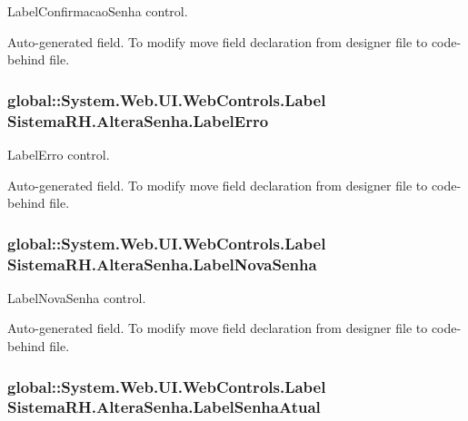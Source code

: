 LabelConfirmacaoSenha control. 

Auto-\/generated field. To modify move field declaration from designer file to code-\/behind file. \hypertarget{class_sistema_r_h_1_1_altera_senha_ab821993f47e320b0d86f898fcde56d56}{
\subsubsection[{LabelErro}]{\setlength{\rightskip}{0pt plus 5cm}global::System.Web.UI.WebControls.Label {\bf SistemaRH.AlteraSenha.LabelErro}}}
\label{class_sistema_r_h_1_1_altera_senha_ab821993f47e320b0d86f898fcde56d56}


LabelErro control. 

Auto-\/generated field. To modify move field declaration from designer file to code-\/behind file. \hypertarget{class_sistema_r_h_1_1_altera_senha_aaf58ce95cd22dfdadb96b4f62240e9ee}{
\subsubsection[{LabelNovaSenha}]{\setlength{\rightskip}{0pt plus 5cm}global::System.Web.UI.WebControls.Label {\bf SistemaRH.AlteraSenha.LabelNovaSenha}}}
\label{class_sistema_r_h_1_1_altera_senha_aaf58ce95cd22dfdadb96b4f62240e9ee}


LabelNovaSenha control. 

Auto-\/generated field. To modify move field declaration from designer file to code-\/behind file. \hypertarget{class_sistema_r_h_1_1_altera_senha_a4f301cec0dc4bf560db478c244a2a454}{
\subsubsection[{LabelSenhaAtual}]{\setlength{\rightskip}{0pt plus 5cm}global::System.Web.UI.WebControls.Label {\bf SistemaRH.AlteraSenha.LabelSenhaAtual}}}
\label{class_sistema_r_h_1_1_altera_senha_a4f301cec0dc4bf560db478c244a2a454}


